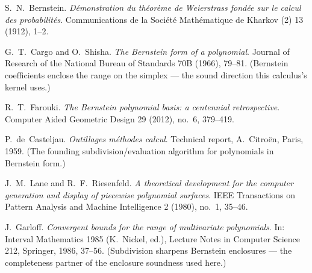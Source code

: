 
S.~N.~Bernstein.
\emph{D\'emonstration du th\'eor\`eme de Weierstrass fond\'ee sur le
calcul des probabilit\'es}.
Communications de la Soci\'et\'e Math\'ematique de Kharkov (2) 13
(1912), 1--2.

G.~T.~Cargo and O.~Shisha.
\emph{The Bernstein form of a polynomial}.
Journal of Research of the National Bureau of Standards 70B (1966),
79--81. (Bernstein coefficients enclose the range on the simplex ---
the sound direction this calculus's kernel uses.)

R.~T.~Farouki.
\emph{The Bernstein polynomial basis: a centennial retrospective}.
Computer Aided Geometric Design 29 (2012), no.~6, 379--419.

P.~de~Casteljau.
\emph{Outillages m\'ethodes calcul}.
Technical report, A.~Citro\"en, Paris, 1959. (The founding
subdivision/evaluation algorithm for polynomials in Bernstein form.)

J.~M.~Lane and R.~F.~Riesenfeld.
\emph{A theoretical development for the computer generation and display
of piecewise polynomial surfaces}.
IEEE Transactions on Pattern Analysis and Machine Intelligence 2
(1980), no.~1, 35--46.

J.~Garloff.
\emph{Convergent bounds for the range of multivariate polynomials}.
In: Interval Mathematics 1985 (K.~Nickel, ed.), Lecture Notes in
Computer Science 212, Springer, 1986, 37--56. (Subdivision sharpens
Bernstein enclosures --- the completeness partner of the enclosure
soundness used here.)
